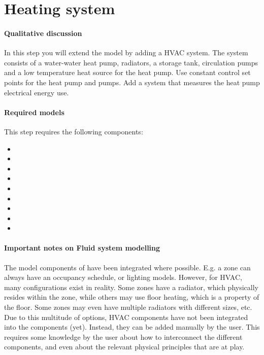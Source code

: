 \documentclass[10pt,a4paper]{article}
\begin{document}
\section{Heating system}
\paragraph{Qualitative discussion}
In this step you will extend the model  
by adding a HVAC system.
The system consists of a water-water heat pump, radiators, 
a storage tank,
circulation pumps and a low temperature heat source for the heat pump.
Use constant control set points for the heat pump and pumps.
Add a system that measures the heat pump electrical energy use.\\
\newpage

\paragraph{Required models}
This step requires the following components:
\begin{itemize}
\item {}
\item {}
\item {}
\item {}
\item {}
\item {}
\item {}
\item {}
\item {}
\end{itemize}

\paragraph{Important notes on Fluid system modelling}
The model components of  have been integrated where possible.
E.g. a zone can always have an occupancy schedule, or lighting models. 
However, for HVAC, many configurations exist in reality. 
Some zones have a radiator, which physically resides within the zone, 
while others may use floor heating, which is a property of the floor.
Some zones may even have multiple radiators with different sizes, etc.
Due to this multitude of options, HVAC components have not been integrated into
the  components (yet).
Instead, they can be added manually by the user.
This requires some knowledge by the user about how to interconnect the different components, 
and even about the relevant physical principles that are at play. \\
\end{document}
